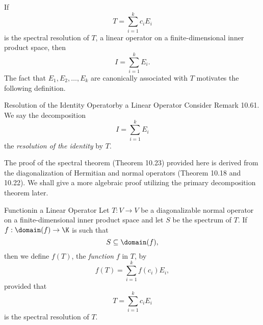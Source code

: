 \documentclass[linearalgebra]{subfiles}
\begin{document}
    \begin{remark}
        If
        \begin{equation*}
            T = \sum^{k}_{i=1} c_iE_i
        \end{equation*}
        is the spectral resolution of $T$, a linear operator on a finite-dimensional inner product space, then
        \begin{equation*}
            I = \sum^{k}_{i=1} E_i.
        \end{equation*}
        The fact that $E_1,E_2,\ldots,E_k$ are canonically associated with $T$ motivates the following definition.
    \end{remark}

    \begin{definition}{Resolution of the Identity Operator}{by a Linear Operator}
        Consider Remark 10.61. We say the decomposition
        \begin{equation*}
            I = \sum^{k}_{i=1} E_i
        \end{equation*}
        the \emph{resolution of the identity} by $T$.
    \end{definition}

    \begin{remark}
        The proof of the spectral theorem (Theorem 10.23) provided here is derived from the diagonalization of Hermitian and normal operators (Theorem 10.18 and 10.22). We shall give a more algebraic proof utilizing the primary decomposition theorem later.
    \end{remark}

    \begin{definition}{Function}{in a Linear Operator}
        Let $T:V\to V$ be a diagonalizable normal operator on a finite-dimensional inner product space and let $S$ be the spectrum of $T$. If $f:\domain(f)\to\K$ is such that
        \begin{equation*}
            S\subseteq \domain(f),
        \end{equation*}
        then we define $f(T)$, the \emph{function} $f$ in $T$, by
        \begin{equation*}
            f(T) = \sum^{k}_{i=1} f\left( c_i \right) E_i,
        \end{equation*}
        provided that 
        \begin{equation*}
            T = \sum^{k}_{i=1} c_iE_i
        \end{equation*}
        is the spectral resolution of $T$.
    \end{definition}
\end{document}

